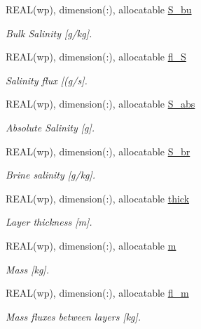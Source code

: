 \begin{DoxyCompactItemize}
REAL(wp), dimension(:), allocatable \hyperlink{namespacemo__data_a24861c159e2b136fb56a61bc9f2de7a7}{S\_\-bu}
\begin{DoxyCompactList}\small\item\em Bulk Salinity \mbox{[}g/kg\mbox{]}. \item\end{DoxyCompactList}\item 
REAL(wp), dimension(:), allocatable \hyperlink{namespacemo__data_a43d6e453737affa893b8a861be921f5d}{fl\_\-S}
\begin{DoxyCompactList}\small\item\em Salinity flux \mbox{[}(g/s\mbox{]}. \item\end{DoxyCompactList}\item 
REAL(wp), dimension(:), allocatable \hyperlink{namespacemo__data_a1bc8433ee56482cce780b7630ab22867}{S\_\-abs}
\begin{DoxyCompactList}\small\item\em Absolute Salinity \mbox{[}g\mbox{]}. \item\end{DoxyCompactList}\item 
REAL(wp), dimension(:), allocatable \hyperlink{namespacemo__data_aa70fa9ad64d25cd4c15584fbc834d820}{S\_\-br}
\begin{DoxyCompactList}\small\item\em Brine salinity \mbox{[}g/kg\mbox{]}. \item\end{DoxyCompactList}\item 
REAL(wp), dimension(:), allocatable \hyperlink{namespacemo__data_a1409d49184dc3835ab1186dde372d381}{thick}
\begin{DoxyCompactList}\small\item\em Layer thickness \mbox{[}m\mbox{]}. \item\end{DoxyCompactList}\item 
REAL(wp), dimension(:), allocatable \hyperlink{namespacemo__data_af1813881649730f758278713d7d72d18}{m}
\begin{DoxyCompactList}\small\item\em Mass \mbox{[}kg\mbox{]}. \item\end{DoxyCompactList}\item 
REAL(wp), dimension(:), allocatable \hyperlink{namespacemo__data_ac4fb31397da08679eac0e3089b60447a}{fl\_\-m}
\begin{DoxyCompactList}\small\item\em Mass fluxes between layers \mbox{[}kg\mbox{]}. \item\end{DoxyCompactList}\item 

\end{DoxyCompactItemize}
